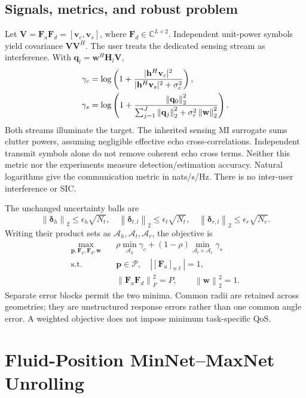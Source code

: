 \documentclass[10pt,journal,onecolumn,draftclsnofoot]{IEEEtran}
\newcommand{\Fa}{\mathbf F_a}\newcommand{\Fd}{\mathbf F_d}
\newcommand{\pp}{\mathbf p}\newcommand{\xx}{\mathbf x}\newcommand{\ww}{\mathbf w}
\newcommand{\norm}[1]{\left\|#1\right\|}
\begin{document}
\subsection{Signals, metrics, and robust problem}
Let $\mathbf V=\Fa\Fd=[\mathbf v_c,\mathbf v_s]$, where $\Fd\in\mathbb C^{L\times2}$. Independent unit-power symbols yield covariance $\mathbf V\mathbf V^H$. The user treats the dedicated sensing stream as interference. With $\mathbf q_l=\ww^H\mathbf H_l\mathbf V$,
\begin{align}
 \gamma_c&=\log\left(1+\frac{|\hh^H\mathbf v_c|^2}{|\hh^H\mathbf v_s|^2+\sigma_c^2}\right),\label{eq:comm}\\
 \gamma_s&=\log\left(1+\frac{\norm{\mathbf q_0}_2^2}{\sum_{j=1}^J\norm{\mathbf q_j}_2^2+\sigma_r^2\norm{\ww}_2^2}\right).\label{eq:sense}
\end{align}
Both streams illuminate the target. The inherited sensing MI surrogate sums clutter powers, assuming negligible effective echo cross-correlations. Independent transmit symbols alone do not remove coherent echo cross terms. Neither this metric nor the experiments measure detection/estimation accuracy. Natural logarithms give the communication metric in nats/s/Hz. There is no inter-user interference or SIC.

The unchanged uncertainty balls are
\begin{equation}
 \norm{\bm\delta_h}_2\le\epsilon_h\sqrt{N_t},\quad
 \norm{\bm\delta_{t,l}}_2\le\epsilon_t\sqrt{N_t},\quad
 \norm{\bm\delta_{r,l}}_2\le\epsilon_r\sqrt{N_r}.\label{eq:balls}
\end{equation}
Writing their product sets as $\mathcal A_h,\mathcal A_t,\mathcal A_r$, the objective is
\begin{equation}
\begin{aligned}
 \max_{\pp,\Fa,\Fd,\ww}\quad&\rho\min_{\mathcal A_h}\gamma_c+
 (1-\rho)\min_{\mathcal A_t\times\mathcal A_r}\gamma_s\\
 \mathrm{s.t.}\quad&\pp\in\mathcal P,\quad |[\Fa]_{n\ell}|=1,\\
 &\norm{\Fa\Fd}_F^2=P,\qquad\norm{\ww}_2^2=1.
\end{aligned}\label{eq:problem}
\end{equation}
Separate error blocks permit the two minima. Common radii are retained across geometries; they are unstructured response errors rather than one common angle error. A weighted objective does not impose minimum task-specific QoS.

\section{Fluid-Position MinNet--MaxNet Unrolling}
\end{document}
